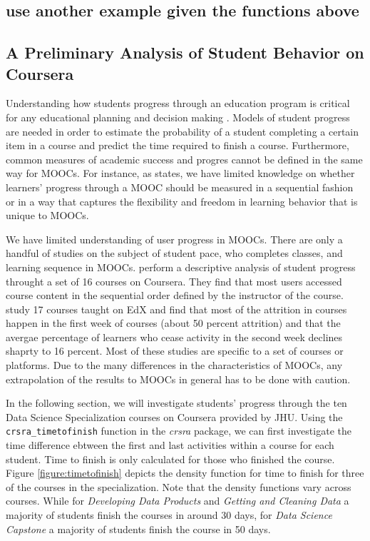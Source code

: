 \subsection{use another example given the functions
above}\label{use-another-example-given-the-functions-above}

\subsection{A Preliminary Analysis of Student Behavior on
Coursera}\label{a-preliminary-analysis-of-student-behavior-on-coursera}

Understanding how students progress through an education program is
critical for any educational planning and decision making
\citep{king1972primary}. Models of student progress are needed in order
to estimate the probability of a student completing a certain item in a
course and predict the time required to finish a course. Furthermore,
common measures of academic success and progres cannot be defined in the
same way for MOOCs. For instance, as \cite{perna2014moving} states, we
have limited knowledge on whether learners' progress through a MOOC
should be measured in a sequential fashion or in a way that captures the
flexibility and freedom in learning behavior that is unique to MOOCs.

We have limited understanding of user progress in MOOCs. There are only
a handful of studies on the subject of student pace, who completes
classes, and learning sequence in MOOCs. \cite{perna2014moving} perform
a descriptive analysis of student progress throught a set of 16 courses
on Coursera. They find that most users accessed course content in the
sequential order defined by the instructor of the course.
\cite{ho2014harvardx} study 17 courses taught on EdX and find that most
of the attrition in courses happen in the first week of courses (about
50 percent attrition) and that the avergae percentage of learners who
cease activity in the second week declines shaprty to 16 percent. Most
of these studies are specific to a set of courses or platforms. Due to
the many differences in the characteristics of MOOCs, any extrapolation
of the results to MOOCs in general has to be done with caution.

In the following section, we will investigate students' progress through
the ten Data Science Specialization courses on Coursera provided by JHU.
Using the \texttt{crsra\_timetofinish} function in the \emph{crsra}
package, we can first investigate the time difference ebtween the first
and last activities within a course for each student. Time to finish is
only calculated for those who finished the course. Figure
\ref{figure:timetofinish} depicts the density function for time to
finish for three of the courses in the specialization. Note that the
density functions vary across courses. While for \emph{Developing Data
Products} and \emph{Getting and Cleaning Data} a majority of students
finish the courses in around 30 days, for \emph{Data Science Capstone} a
majority of students finish the course in 50 days.

